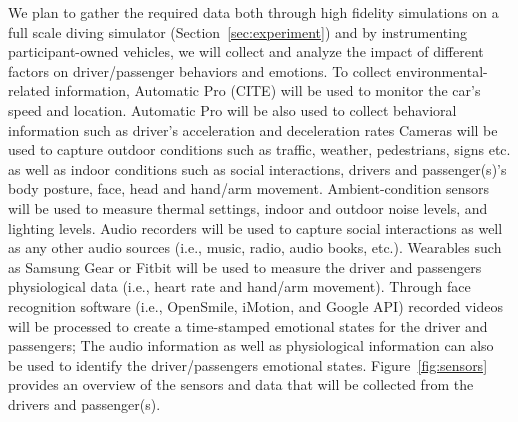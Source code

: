 We plan to gather the required data both through high fidelity simulations on a full scale diving simulator (Section~\ref{sec:experiment}) and by instrumenting participant-owned vehicles, we will collect and analyze the impact of different factors on driver/passenger behaviors and emotions.
To collect environmental-related information, Automatic Pro (CITE) will be used to monitor the car's speed and location. 
Automatic Pro will be also used to collect behavioral information such as driver's acceleration and deceleration rates
Cameras will be used to capture outdoor conditions such as traffic, weather, pedestrians, signs etc. as well as indoor conditions such as social interactions, drivers and passenger(s)'s body posture, face, head and hand/arm movement. 
Ambient-condition sensors will be used to measure thermal settings, indoor and outdoor noise levels, and lighting levels. 
Audio recorders will be used to capture social interactions as well as any other audio sources (i.e., music, radio, audio books, etc.). 
Wearables such as Samsung Gear or Fitbit will be used to measure the driver and passengers physiological data (i.e., heart rate and hand/arm movement). Through face recognition software (i.e., OpenSmile, iMotion, and Google API) recorded videos will be processed to create a time-stamped emotional states for the driver and passengers; 
The audio information as well as physiological information can also be used to identify the driver/passengers emotional states. 
Figure~\ref{fig:sensors} provides an overview of the sensors and data that will be collected from the drivers and passenger(s).   


